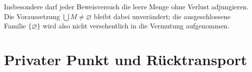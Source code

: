 \documentclass[main.tex]{subfiles}
\begin{document}
Insbesondere darf jeder Beweisversuch die leere Menge ohne Verlust
adjungieren. Die Voraussetzung \(\bigcup M\neq\varnothing\) bleibt dabei
unverändert; die ausgeschlossene Familie \(\{\varnothing\}\) wird also nicht
versehentlich in die Vermutung aufgenommen.

\section{Privater Punkt und Rücktransport}

\end{document}
